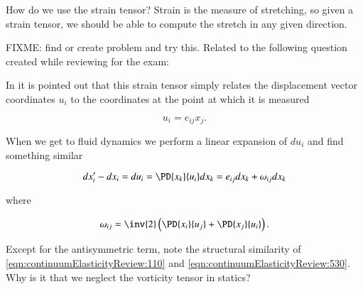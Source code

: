 \begin{Exercise}[
title={Computing stretch in any given direction},
label={problem:strain:todo}
]

How do we use the strain tensor?  Strain is the measure of stretching, so given a strain tensor, we should be able to compute the stretch in any given direction.

FIXME: find or create problem and try this.  Related to the following question created while reviewing for the exam:

In \cite{feynman1963flp:elasticMaterials} it is pointed out that this strain tensor simply relates the displacement vector coordinates $u_i$ to the coordinates at the point at which it is measured

\begin{equation}\label{eqn:continuumElasticityReview:110}
u_i = e_{ij} x_j.
\end{equation}

When we get to fluid dynamics we perform a linear expansion of $du_i$ and find something similar

\begin{equation}\label{eqn:continuumElasticityReview:530}
dx_i' - dx_i = du_i = \PD{x_k}{u_i} dx_k = e_{ij} dx_k + \omega_{ij} dx_k
\end{equation}

where

\begin{equation}\label{eqn:continuumElasticityReview:550}
\omega_{ij} = \inv{2} \left( \PD{x_i}{u_j} +\PD{x_j}{u_i} \right).
\end{equation}

Except for the antisymmetric term, note the structural similarity of \ref{eqn:continuumElasticityReview:110} and \ref{eqn:continuumElasticityReview:530}.  Why is it that we neglect the vorticity tensor in statics?
%
%

\end{Exercise}

